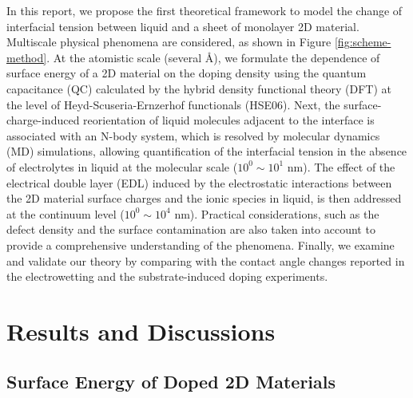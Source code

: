 \documentclass[journal=ancac3,manuscript=article,email=true,hyperref=true,keywords=true]{achemso}
\begin{document}
In this report, we propose the first theoretical framework to model
the change of interfacial tension between liquid and a sheet of
monolayer 2D material. Multiscale physical phenomena are considered,
as shown in Figure \ref{fig:scheme-method}. At the atomistic scale
(several \AA{}), we formulate the dependence of surface energy of a 2D
material on the doping density using the quantum capacitance (QC)
calculated by the hybrid density functional theory (DFT) at the level
of Heyd-Scuseria-Ernzerhof functionals (HSE06). Next, the
surface-charge-induced reorientation of liquid molecules adjacent to
the interface is associated with an N-body system, which is resolved
by molecular dynamics (MD) simulations, allowing quantification of the
interfacial tension in the absence of electrolytes in liquid at the
molecular scale (\(10^{0} \sim 10^{1}\) nm). The effect of the electrical
double layer (EDL) induced by the electrostatic interactions between
the 2D material surface charges and the ionic species in liquid, is
then addressed at the continuum level (\(10^{0} \sim 10^{4}\) nm). Practical
considerations, such as the defect density and the surface
contamination are also taken into account to provide a comprehensive
understanding of the phenomena. Finally, we examine and validate our
theory by comparing with the contact angle changes reported in the
electrowetting and the substrate-induced doping experiments.

\section{Results and Discussions}
\label{sec:orgae60da0}

\subsection{Surface Energy of Doped 2D Materials}
\label{sec:org484e298}
\end{document}
